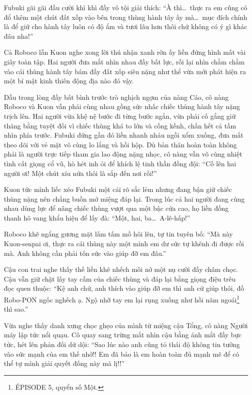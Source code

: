 \documentclass[../main.tex]{subfiles}
\begin{document}
Fubuki gãi gãi đầu cười khì khì đầy vô tội giải thích: ``À thì\dots\ thực ra em cũng có đổ thêm một chút đất xốp vào bên trong thùng hành tây ấy mà\dots\ mục đích chính là để giữ cho hành tây luôn có độ ẩm và tươi lâu hơn thôi chứ không có ý gì khác đâu nha!''

Cả Roboco lẫn Kuon nghe xong lời thú nhận xanh rờn ấy liền đứng hình mất vài giây toàn tập. Hai người đưa mắt nhìn nhau đầy bất lực, rồi lại nhìn chằm chằm vào cái thùng hành tây bám đầy đất xốp siêu nặng như thể vừa mới phát hiện ra một bí mật kinh thiên động địa nào đó vậy.

\ct

Dẫu trong lòng đầy bất bình trước trò nghịch ngợm của nàng Cáo, cô nàng Roboco và Kuon vẫn phải cùng nhau gồng sức nhấc chiếc thùng hành tây nặng trịch lên. Hai người vừa khệ nệ bước đi từng bước ngắn, vừa phải cố gắng giữ thăng bằng tuyệt đối vì chiếc thùng khá to lớn và cồng kềnh, chắn hết cả tầm nhìn phía trước. Fubuki đứng gần đó liền nhanh nhảu ngồi xổm xuống, đưa mắt theo dõi với vẻ mặt vô cùng lo lắng và hồi hộp. Dù bản thân hoàn toàn không phải là người trực tiếp tham gia lao động nặng nhọc, cô nàng vẫn vô cùng nhiệt tình cất giọng cổ vũ, hò hét inh ỏi để khích lệ tinh thần đồng đội: ``Cố lên hai người ơi! Một chút xíu nữa thôi là sắp đến nơi rồi!''


Kuon tức mình liếc xéo Fubuki một cái rõ sắc lẻm nhưng đang bận giữ chiếc thùng nặng nên chẳng buồn mở miệng đáp lại. Trong lúc cả hai người đang cùng nhau dùng lực để nâng chiếc thùng vượt qua một bậc cửa cao, họ liền đồng thanh hô vang khẩu hiệu để lấy đà: ``Một, hai, ba\dots\ A-lê-hấp!''

Roboco khẽ ngẩng gương mặt lấm tấm mồ hôi lên, tự tin tuyên bố: ``Mà này Kuon-senpai ơi, thực ra cái thùng này một mình em dư sức tự khênh đi được rồi mà. Anh không cần phải tốn sức vào giúp đỡ em đâu.''

Cậu con trai nghe thấy thế liền khẽ nhếch môi nở một nụ cười đầy châm chọc. Cậu vẫn giữ chặt lấy tay cầm của chiếc thùng và đáp lại bằng giọng điệu trêu đọc quen thuộc: ``Kệ anh chứ, anh thích vào giúp đỡ em thì anh cứ giúp thôi, đồ Robo-PON ngốc nghếch ạ. Ngộ nhỡ tay em lại rụng xuống như hồi năm ngoái\footnote{{\flaregothic ÉPISODE 5}, quyển số Một.} thì sao.''

Vừa nghe thấy danh xưng chọc ghẹo của mình từ miệng cậu Tổng, cô nàng Người máy lập tức nổi quạu. Cô quay sang trừng mắt nhìn cậu bằng ánh mắt đầy bực tức, hét lên phản đối dữ dội: ``Sao lúc nào anh cũng tỏ thái độ không tin tưởng vào sức mạnh của em thế nhở!! Em đã bảo là em hoàn toàn đủ mạnh mẽ để có thể tự mình giải quyết đống này mà lị!!''
\end{document}
